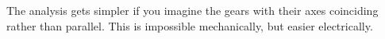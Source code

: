 The analysis gets simpler if you imagine the gears with their axes coinciding rather than
parallel. This is impossible mechanically, but easier electrically.
